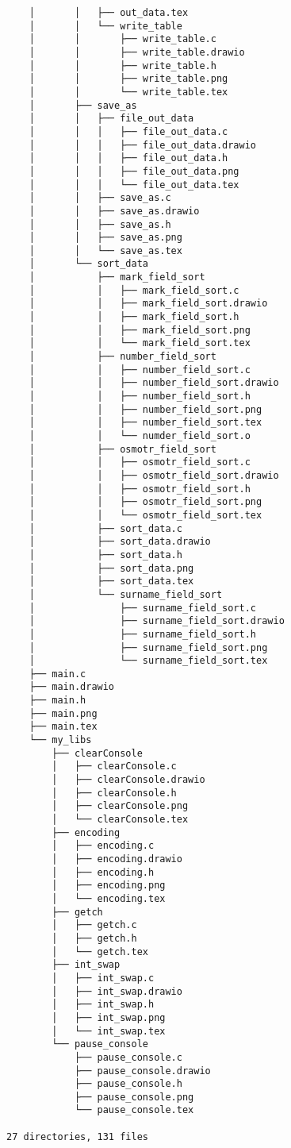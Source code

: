 {\begin{verbatim}
    │       │   ├── out_data.tex
    │       │   └── write_table
    │       │       ├── write_table.c
    │       │       ├── write_table.drawio
    │       │       ├── write_table.h
    │       │       ├── write_table.png
    │       │       └── write_table.tex
    │       ├── save_as
    │       │   ├── file_out_data
    │       │   │   ├── file_out_data.c
    │       │   │   ├── file_out_data.drawio
    │       │   │   ├── file_out_data.h
    │       │   │   ├── file_out_data.png
    │       │   │   └── file_out_data.tex
    │       │   ├── save_as.c
    │       │   ├── save_as.drawio
    │       │   ├── save_as.h
    │       │   ├── save_as.png
    │       │   └── save_as.tex
    │       └── sort_data
    │           ├── mark_field_sort
    │           │   ├── mark_field_sort.c
    │           │   ├── mark_field_sort.drawio
    │           │   ├── mark_field_sort.h
    │           │   ├── mark_field_sort.png
    │           │   └── mark_field_sort.tex
    │           ├── number_field_sort
    │           │   ├── number_field_sort.c
    │           │   ├── number_field_sort.drawio
    │           │   ├── number_field_sort.h
    │           │   ├── number_field_sort.png
    │           │   ├── number_field_sort.tex
    │           │   └── numder_field_sort.o
    │           ├── osmotr_field_sort
    │           │   ├── osmotr_field_sort.c
    │           │   ├── osmotr_field_sort.drawio
    │           │   ├── osmotr_field_sort.h
    │           │   ├── osmotr_field_sort.png
    │           │   └── osmotr_field_sort.tex
    │           ├── sort_data.c
    │           ├── sort_data.drawio
    │           ├── sort_data.h
    │           ├── sort_data.png
    │           ├── sort_data.tex
    │           └── surname_field_sort
    │               ├── surname_field_sort.c
    │               ├── surname_field_sort.drawio
    │               ├── surname_field_sort.h
    │               ├── surname_field_sort.png
    │               └── surname_field_sort.tex
    ├── main.c
    ├── main.drawio
    ├── main.h
    ├── main.png
    ├── main.tex
    └── my_libs
        ├── clearConsole
        │   ├── clearConsole.c
        │   ├── clearConsole.drawio
        │   ├── clearConsole.h
        │   ├── clearConsole.png
        │   └── clearConsole.tex
        ├── encoding
        │   ├── encoding.c
        │   ├── encoding.drawio
        │   ├── encoding.h
        │   ├── encoding.png
        │   └── encoding.tex
        ├── getch
        │   ├── getch.c
        │   ├── getch.h
        │   └── getch.tex
        ├── int_swap
        │   ├── int_swap.c
        │   ├── int_swap.drawio
        │   ├── int_swap.h
        │   ├── int_swap.png
        │   └── int_swap.tex
        └── pause_console
            ├── pause_console.c
            ├── pause_console.drawio
            ├── pause_console.h
            ├── pause_console.png
            └── pause_console.tex

27 directories, 131 files
\end{verbatim}

}